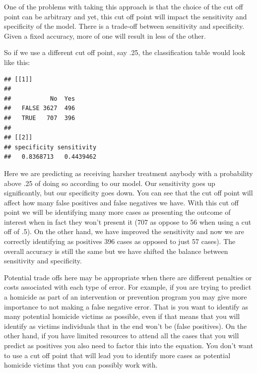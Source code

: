 \documentclass[]{book}
\newenvironment{Shaded}{\begin{snugshade}}{\end{snugshade}}
\newcommand{\ControlFlowTok}[1]{\textcolor[rgb]{0.13,0.29,0.53}{\textbf{#1}}}
\newcommand{\DecValTok}[1]{\textcolor[rgb]{0.00,0.00,0.81}{#1}}
\newcommand{\KeywordTok}[1]{\textcolor[rgb]{0.13,0.29,0.53}{\textbf{#1}}}
\newcommand{\NormalTok}[1]{#1}
\newcommand{\OperatorTok}[1]{\textcolor[rgb]{0.81,0.36,0.00}{\textbf{#1}}}
\newcommand{\StringTok}[1]{\textcolor[rgb]{0.31,0.60,0.02}{#1}}
\theoremstyle{definition}
\theoremstyle{definition}
\theoremstyle{definition}
\theoremstyle{remark}
\begin{document}
One of the problems with taking this approach is that the choice of the
cut off point can be arbitrary and yet, this cut off point will impact
the sensitivity and specificity of the model. There is a trade-off
between sensitivity and specificity. Given a fixed accuracy, more of one
will result in less of the other.

So if we use a different cut off point, say .25, the classification
table would look like this:

\begin{Shaded}
\end{Shaded}

\begin{verbatim}
## [[1]]
##        
##           No  Yes
##   FALSE 3627  496
##   TRUE   707  396
## 
## [[2]]
## specificity sensitivity 
##   0.8368713   0.4439462
\end{verbatim}

Here we are predicting as receiving harsher treatment anybody with a
probability above .25 of doing so according to our model. Our
sensitivity goes up significantly, but our specificity goes down. You
can see that the cut off point will affect how many false positives and
false negatives we have. With this cut off point we will be identifying
many more cases as presenting the outcome of interest when in fact they
won't present it (707 as oppose to 56 when using a cut off of .5). On
the other hand, we have improved the sensitivity and now we are
correctly identifying as positives 396 cases as opposed to just 57
cases). The overall accuracy is still the same but we have shifted the
balance between sensitivity and specificity.

Potential trade offs here may be appropriate when there are different
penalties or costs associated with each type of error. For example, if
you are trying to predict a homicide as part of an intervention or
prevention program you may give more importance to not making a false
negative error. That is you want to identify as many potential homicide
victims as possible, even if that means that you will identify as
victims individuals that in the end won't be (false positives). On the
other hand, if you have limited resources to attend all the cases that
you will predict as positives you also need to factor this into the
equation. You don't want to use a cut off point that will lead you to
identify more cases as potential homicide victims that you can possibly
work with.
\end{document}
